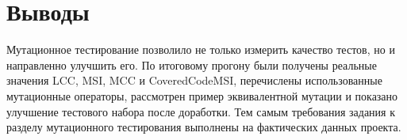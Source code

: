 \section{Выводы} \label{ch6:conclusion}

Мутационное тестирование позволило не только измерить качество тестов, но и направленно улучшить его.
По итоговому прогону были получены реальные значения LCC, MSI, MCC и CoveredCodeMSI, перечислены использованные мутационные операторы, рассмотрен пример эквивалентной мутации и показано улучшение тестового набора после доработки.
Тем самым требования задания к разделу мутационного тестирования выполнены на фактических данных проекта.
